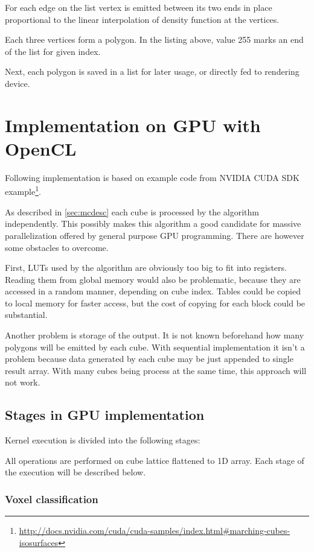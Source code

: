 For each edge on the list vertex is emitted between its two ends in place
proportional to the linear interpolation of density function at the vertices.

Each three vertices form a polygon. In the listing above, value 255 marks an end
of the list for given index.

Next, each polygon is saved in a list for later usage, or directly fed to
rendering device.

\section{Implementation on GPU with OpenCL}
\label{sec:mcgpu}
Following implementation is based on example code from NVIDIA CUDA SDK
example\footnote{\url{http://docs.nvidia.com/cuda/cuda-samples/index.html\#marching-cubes-isosurfaces}}.

As described in \autoref{sec:mcdesc} each cube is processed by the algorithm
independently. This possibly makes this algorithm a good candidate for massive
parallelization offered by general purpose GPU programming. There are however
some obstacles to overcome.

First, LUTs used by the algorithm are obviously too big to fit into registers.
Reading them from global memory would also be problematic, because they are
accessed in a random manner, depending on cube index. Tables could be copied
to local memory for faster access, but the cost of copying for each block could
be substantial.

Another problem is storage of the output. It is not known beforehand how many
polygons will be emitted by each cube. With sequential implementation it isn't a
problem because data generated by each cube may be just appended to single
result array. With many cubes being process at the same time, this approach
will not work.

\subsection{Stages in GPU implementation}
Kernel execution is divided into the following stages:

All operations are performed on cube lattice flattened to 1D array. Each stage
of the execution will be described below.

\subsubsection{Voxel classification}

